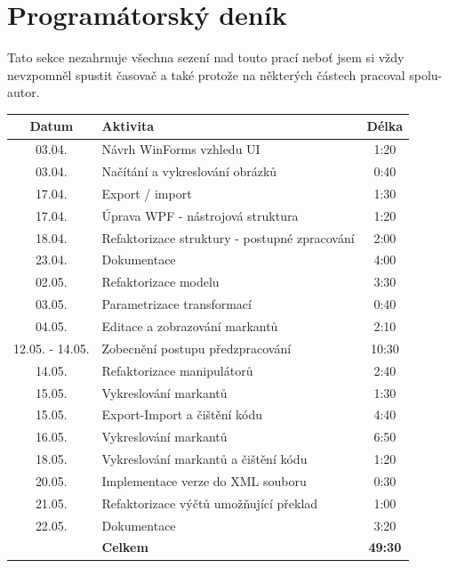 \documentclass[12pt,a4paper]{article}
\let\oldsection\section
\renewcommand\section{\clearpage\oldsection}
\begin{document}
\section*{Programátorský deník}
Tato sekce nezahrnuje všechna sezení nad touto prací neboť jsem si vždy nevzpomněl spustit časovač a také protože na některých částech pracoval spolu-autor.
\begin{table}[h!]
\centering
\begin{tabular}
{| c | >{\centering}m{12cm} | c |} \hline
Datum & Aktivita & Délka \\ \hline

03.04. & Návrh WinForms vzhledu UI & 1:20 \\ \hline
03.04. & Načítání a vykreslování obrázků & 0:40 \\ \hline
17.04. & Export / import & 1:30 \\ \hline
17.04. & Úprava WPF - nástrojová struktura & 1:20 \\ \hline
18.04. & Refaktorizace struktury - postupné zpracování & 2:00 \\ \hline
23.04. & Dokumentace & 4:00 \\ \hline
02.05. & Refaktorizace modelu & 3:30 \\ \hline
03.05. & Parametrizace transformací & 0:40 \\ \hline
04.05. & Editace a zobrazování markantů & 2:10 \\ \hline
12.05. - 14.05. & Zobecnění postupu předzpracování & 10:30 \\ \hline
14.05. & Refaktorizace manipulátorů & 2:40 \\ \hline
15.05. & Vykreslování markantů & 1:30 \\ \hline
15.05. & Export-Import a čištění kódu & 4:40 \\ \hline
16.05. & Vykreslování markantů & 6:50 \\ \hline
18.05. & Vykreslování markantů a čištění kódu & 1:20 \\ \hline
20.05. & Implementace verze do XML souboru & 0:30 \\ \hline
21.05. & Refaktorizace výčtů umožňující překlad & 1:00 \\ \hline
22.05. & Dokumentace & 3:20 \\ \hline


\hline
 & \textbf{Celkem} & \textbf{49:30} \\ \hline

\end{tabular}
\end{table}

\end{document}
